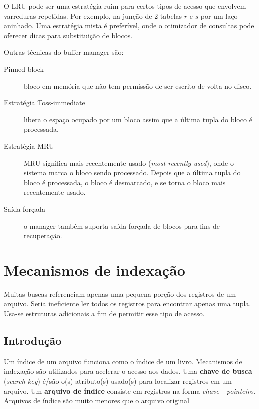 O LRU pode ser uma estratégia ruim para certos tipos de acesso que envolvem varreduras repetidas.
Por exemplo, na junção de 2 tabelas $r$ e $s$ por um laço aninhado. 
Uma estratégia mista é preferível, onde o otimizador de consultas pode oferecer dicas
para substituição de blocos.

Outras técnicas do buffer manager são:
\begin{description}
\item[Pinned block] bloco em memória que não tem permissão de ser escrito
de volta no disco.

\item[Estratégia Toss-immediate]  libera o espaço ocupado por um bloco assim que 
a última tupla do bloco é processada.

\item[Estratégia MRU] MRU significa mais recentemente usado (\emph{most recently used}), onde 
o sistema marca o bloco sendo processado. Depois que a última tupla do bloco é processada,
o bloco é desmarcado, e se torna o bloco mais recentemente usado.

\item[Saída forçada] o manager também suporta saída forçada de blocos para fins de 
recuperação.
\end{description}

\section{Mecanismos de indexação}

Muitas buscas referenciam apenas uma pequena porção dos registros de um arquivo.
Seria ineficiente ler todos os registros para encontrar apenas uma tupla.
Usa-se estruturas adicionais a fim de permitir esse tipo de acesso.

\subsection{Introdução}

Um índice de um arquivo funciona como o índice de um livro.
Mecanismos de indexação são utilizados para acelerar o acesso
aos dados.
Uma \textbf{chave de busca} (\emph{search key}) é/são o(s) atributo(s) usado(s)
para localizar registros em um arquivo.
Um \textbf{arquivo de índice} consiste em registros na forma \emph{chave -
pointeiro}.
Arquivos de índice são muito menores que o arquivo original

